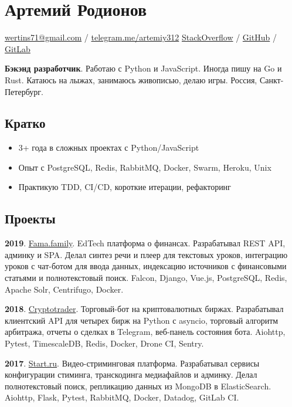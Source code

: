 \documentclass[12pt]{article}
\begin{document}
\section*{Артемий Родионов}

\href{mailto:wertins71@gmail.com}{wertins71@gmail.com} / \href{https://t.me/artemiy312}{telegram.me/artemiy312} \newline
\href{https://stackoverflow.com/users/6800156}{StackOverflow} /
\href{https://github.com/artemiy312}{GitHub} /
\href{https://gitlab.com/artemiy312}{GitLab}

\medskip\textbf{Бэкэнд разработчик}.
Работаю с Python и JavaScript.
Иногда пишу на Go и Rust.
Катаюсь на лыжах, занимаюсь живописью, делаю игры.
Россия, Санкт-Петербург.

\subsection*{Кратко}
\begin{itemize}
\item 3+ года в сложных проектах с Python/JavaScript
\item Опыт с PostgreSQL, Redis, RabbitMQ, Docker, Swarm, Heroku, Unix
\item Практикую TDD, CI/CD, короткие итерации, рефакторинг
\end{itemize}

\subsection*{Проекты}

\textbf{2019}. \href{https://app.fama.family/}{Fama.family}. EdTech платформа о финансах.
Разрабатывал REST API, админку и SPA.
Делал синтез речи и плеер для текстовых уроков, интеграцию уроков с чат-ботом для ввода данных, индексацию источников с финансовыми статьями и полнотекстовый поиск.
Falcon, Django, Vue.js, PostgreSQL, Redis, Apache Solr, Centrifugo, Docker.

\medskip
\textbf{2018}. \href{https://github.com/fidals/cryptotrader}{Cryptotrader}. Торговый-бот на криптовалютных биржах.
Разрабатывал клиентский API для четырех бирж на Python с asyncio, торговый алгоритм арбитража, отчеты о сделках в Telegram, веб-панель состояния бота.
Aiohttp, Pytest, TimescaleDB, Redis, Docker, Drone CI, Sentry.

\medskip
\textbf{2017}. \href{https://start.ru/}{Start.ru}. Видео-стриминговая платформа.
Разрабатывал сервисы конфигурации стиминга, транскодинга медиафайлов и админку.
Делал полнотекстовый поиск, репликацию данных из MongoDB в ElasticSearch.
Aiohttp, Flask, Pytest, RabbitMQ, Docker, Datadog, GitLab CI.
\end{document}
